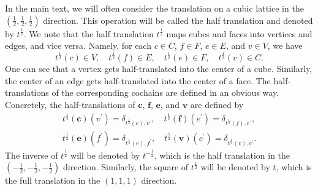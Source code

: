 \documentclass[aps,twocolumn,prx,floatfix,preprintnumbers, nofootinbib,10pt]{revtex4-2}
\numberwithin{equation}{section}
\theoremstyle{definition}
\theoremstyle{remark}
\theoremstyle{claim}
\begin{document}
\vspace*{\baselineskip}
In the main text, we will often consider the translation on a cubic lattice in the $(\frac{1}{2}, \frac{1}{2}, \frac{1}{2})$ direction.
This operation will be called the half translation and denoted by $t^{\frac{1}{2}}$.
We note that the half translation $t^{\frac{1}{2}}$ maps cubes and faces into vertices and edges, and vice versa.
Namely, for each $c \in C$, $f \in F$, $e \in E$, and $v \in V$, we have
\begin{equation}
t^{\frac{1}{2}}(c) \in V, \quad
t^{\frac{1}{2}}(f) \in E, \quad
t^{\frac{1}{2}}(e) \in F, \quad
t^{\frac{1}{2}}(v) \in C.
\end{equation}
One can see that a vertex gets half-translated into the center of a cube. Similarly, the center of an edge gets half-translated into the center of a face.
The half-translations of the corresponding cochains are defined in an obvious way.
Concretely, the half-translations of $\bm{c}$, $\bm{f}$, $\bm{e}$, and $\bm{v}$ are defined by
\begin{equation}
\begin{aligned}
t^{\frac{1}{2}}(\bm{c})(v^{\prime}) = \delta_{t^{\frac{1}{2}}(c), v^{\prime}}, \quad
t^{\frac{1}{2}}(\bm{f})(e^{\prime}) = \delta_{t^{\frac{1}{2}}(f), e^{\prime}}, \\
t^{\frac{1}{2}}(\bm{e})(f^{\prime}) = \delta_{t^{\frac{1}{2}}(e), f^{\prime}}, \quad
t^{\frac{1}{2}}(\bm{v})(c^{\prime}) = \delta_{t^{\frac{1}{2}}(v), c^{\prime}}.
\end{aligned}
\end{equation}
The inverse of $t^{\frac{1}{2}}$ will be denoted by $t^{-\frac{1}{2}}$, which is the half translation in the $(-\frac{1}{2}, -\frac{1}{2}, -\frac{1}{2})$ direction.
Similarly, the square of $t^{\frac{1}{2}}$ will be denoted by $t$, which is the full translation in the $(1, 1, 1)$ direction.
\end{document}
